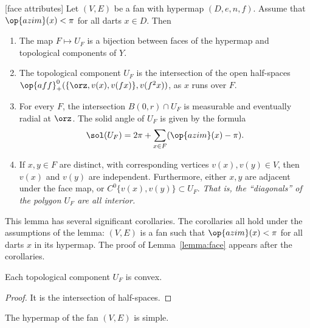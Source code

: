 \begin{lemma}[face attributes]\label{lemma:face}
Let $(V,E)$ be a fan with hypermap $(D,e,n,f)$. 
Assume that $\op{azim}(x)<\pi$
for all darts $x\in D$.  Then
\begin{enumerate}
\item {} The map $F\mapsto U_F$ is a bijection between faces of the hypermap
and topological components of $Y$.
\item {} The topological component $U_F$ is the intersection of the open
half-spaces $\op{aff}_+^0(\{\orz,v(x),v({f x})\},v(f^2 x))$, as $x$ runs
over $F$.
\item {} For every $F$, the intersection $B(0,r)\cap U_F$ is measurable and
eventually radial at $\orz$.  The solid angle of $U_F$ is given by the
formula
$$
\sol(U_F) = 2\pi + \sum_{x\in F}(\op{azim}(x)-\pi).
$$
\item {}  If $x,y\in F$ are distinct, with corresponding vertices $v(x),v(y)\in V$, then
$v(x)$ and $v(y)$ are independent.
Furthermore, 
either $x,y$ are adjacent under the face map, or $C^0\{v(x),v(y)\}\subset U_F$.  {\it That is, the ``diagonals'' of the polygon $U_F$ are all interior.}
\end{enumerate}
\end{lemma}

This lemma has several significant corollaries.  The corollaries all hold under the assumptions of the lemma: $(V,E)$ is a fan such that $\op{azim}(x)<\pi$ for all darts $x$ in its hypermap.  The proof of Lemma~\ref{lemma:face} appears after the corollaries.

\begin{corollary}
Each topological component $U_F$ is convex.
\end{corollary}
%
%

\begin{proof} It is the intersection of half-spaces.
\end{proof}

\begin{corollary}  
The hypermap of the fan $(V,E)$ is simple.
\end{corollary}
%

